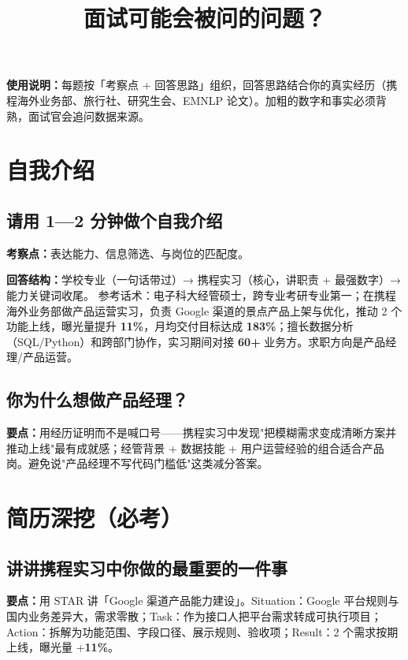 \documentclass[zihao=-4,autoindent=2em]{ctexart}
\title{\heiti\Huge 面试可能会被问的问题？}
\begin{document}
\maketitle
\thispagestyle{empty}
\vspace{-1em}

\noindent\textbf{使用说明：}每题按「考察点 + 回答思路」组织，回答思路结合你的真实经历（携程海外业务部、旅行社、研究生会、EMNLP 论文）。加粗的数字和事实必须背熟，面试官会追问数据来源。

\section{自我介绍}

\subsection{请用 1—2 分钟做个自我介绍}
\textbf{考察点：}表达能力、信息筛选、与岗位的匹配度。

\textbf{回答结构：}学校专业（一句话带过）→ 携程实习（核心，讲职责 + 最强数字）→ 能力关键词收尾。
参考话术：电子科大经管硕士，跨专业考研专业第一；在携程海外业务部做产品运营实习，负责 Google 渠道的景点产品上架与优化，推动 2 个功能上线，曝光量提升 \textbf{11\%}，月均交付目标达成 \textbf{183\%}；擅长数据分析（SQL/Python）和跨部门协作，实习期间对接 \textbf{60+} 业务方。求职方向是产品经理/产品运营。

\subsection{你为什么想做产品经理？}
\textbf{要点：}用经历证明而不是喊口号——携程实习中发现"把模糊需求变成清晰方案并推动上线"最有成就感；经管背景 + 数据技能 + 用户运营经验的组合适合产品岗。避免说"产品经理不写代码门槛低"这类减分答案。

\section{简历深挖（必考）}

\subsection{讲讲携程实习中你做的最重要的一件事}
\textbf{要点：}用 STAR 讲「Google 渠道产品能力建设」。Situation：Google 平台规则与国内业务差异大，需求零散；Task：作为接口人把平台需求转成可执行项目；Action：拆解为功能范围、字段口径、展示规则、验收项；Result：2 个需求按期上线，曝光量 +\textbf{11\%}。
\end{document}
